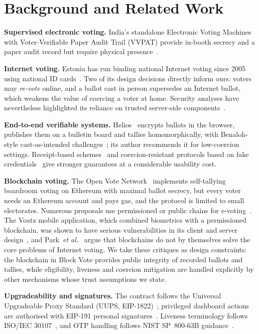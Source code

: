 \documentclass[conference]{IEEEtran}
\begin{document}
\section{Background and Related Work}
\label{sec:related}

\textbf{Supervised electronic voting.} India's standalone Electronic Voting Machines with Voter-Verifiable Paper Audit Trail (VVPAT) provide in-booth secrecy and a paper audit record but require physical presence~\cite{eci_evm}.

\textbf{Internet voting.} Estonia has run binding national Internet voting since 2005 using national ID cards~\cite{madise2006}. Two of its design decisions directly inform ours: voters may \emph{re-vote} online, and a ballot cast in person supersedes an Internet ballot, which weakens the value of coercing a voter at home. Security analyses have nevertheless highlighted its reliance on trusted server-side components~\cite{springall2014}.

\textbf{End-to-end verifiable systems.} Helios~\cite{adida2008} encrypts ballots in the browser, publishes them on a bulletin board and tallies homomorphically, with Benaloh-style cast-as-intended challenges~\cite{benaloh2006}; its author recommends it for low-coercion settings. Receipt-based schemes~\cite{chaum2004} and coercion-resistant protocols based on fake credentials~\cite{juels2005} give stronger guarantees at a considerable usability cost.

\textbf{Blockchain voting.} The Open Vote Network~\cite{mccorry2017} implements self-tallying boardroom voting on Ethereum with maximal ballot secrecy, but every voter needs an Ethereum account and pays gas, and the protocol is limited to small electorates. Numerous proposals use permissioned or public chains for e-voting~\cite{kshetri2018,hjalmarsson2018}. The Voatz mobile application, which combined biometrics with a permissioned blockchain, was shown to have serious vulnerabilities in its client and server design~\cite{specter2020}, and Park~\emph{et al.}~\cite{park2021} argue that blockchains do not by themselves solve the core problems of Internet voting. We take these critiques as design constraints: the blockchain in Block Vote provides public integrity of recorded ballots and tallies, while eligibility, liveness and coercion mitigation are handled explicitly by other mechanisms whose trust assumptions we state.

\textbf{Upgradeability and signatures.} The contract follows the Universal Upgradeable Proxy Standard (UUPS, EIP-1822)~\cite{eip1822}; privileged dashboard actions are authorised with EIP-191 personal signatures~\cite{eip191}. Liveness terminology follows ISO/IEC 30107~\cite{iso30107}, and OTP handling follows NIST SP~800-63B guidance~\cite{nist80063b}.
\end{document}

